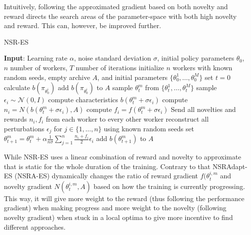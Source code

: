Intuitively, following the approximated gradient based on both novelty and reward directs the search areas of the parameter-space with both high novelty and reward. This can, however, be improved further.

\begin{algorithm}
    \begin{algorithmic}[1]
    \caption{NSR-ES}
    \label{alg:nsr-es}
        \State \textbf{Input}: Learning rate $\alpha$, noise standard deviation $\sigma$, initial policy parameters $\theta_0$, $n$ number of workers, $T$ number of iterations
        \State initialize $n$ workers with known random seeds, empty archive $A$, and initial parameters $\{\theta^1_0,\dots, \theta^M_0\}$
        \State set $t=0$
            \State calculate $b(\pi_{\theta^i_0})$
            \State add $b(\pi_{\theta^i_0})$ to $A$
        \EndFor
            \State sample $\theta_t^m$ from $\{\theta^1_t,\dots, \theta^M_t\}$
                \State sample $\epsilon_i \sim \mathcal{N}(0,I)$ 
                \State compute characteristics $b(\theta^m_t+\sigma\epsilon_i)$
                \State compute $n_i = N(b(\theta^m_t+\sigma\epsilon_i), A)$
                \State compute $f_i = f(\theta^m_t+\sigma\epsilon_i)$
            \EndFor
            \State Send all novelties and rewards $n_i, f_i$ from each worker to every other worker
                \State reconstruct all perturbations $\epsilon_j $ for $j \in \{1,\dots,n\}$ using known random seeds
                \State set $\theta^m_{t+1} = \theta_t^m + \alpha \frac{1}{n\sigma}\sum_{j=1}^n\frac{n_i+f_i}{2}\epsilon_i$
                \State add $b(\theta^m_{t+1})$ to $A$
            \EndFor
        \EndFor
    \end{algorithmic}
\end{algorithm}

While NSR-ES uses a linear combination of reward and novelty to approximate that is static for the whole duration of the training. Contrary to that NSRAdapt-ES (NSRA-ES) dynamically changes the ratio of reward gradient $f(\theta_t^{i,m}$ and novelty gradient $N(\theta_t^{i,m},A)$ based on how the training is currently progressing. This way, it will give more weight to the reward (thus following the performance gradient) when making progress and more weight to the novelty (following novelty gradient) when stuck in a local optima to give more incentive to find different approaches. 


